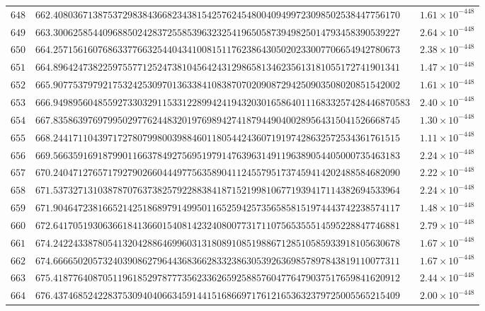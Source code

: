 \documentclass[12pt,reqno]{amsart}
\theoremstyle{remark}
\begin{document}
\begin{longtable}{clc}
$648$ & $662.4080367138753729838436682343815425762454800409499723098502538447756170$ & $1.61\times 10^{-448}$ \\
$649$ & $663.3006258544096885024283725585396323254196505873949825014793458390539227$ & $2.64\times 10^{-448}$ \\
$650$ & $664.2571561607686337766325440434100815117623864305020233007706654942780673$ & $2.38\times 10^{-448}$ \\
$651$ & $664.8964247382259755771252473810456424312986581346235613181055172741901341$ & $1.47\times 10^{-448}$ \\
$652$ & $665.9077537979217532425309701363384108387070209087294250903508020851542002$ & $1.61\times 10^{-448}$ \\
$653$ & $666.949895604855927330329115331228994241943203016586401116833257428446870583$ & $2.40\times 10^{-448}$ \\
$654$ & $667.8358639769799502977624483201976989427418794490400289564315041526668745$ & $1.30\times 10^{-448}$ \\
$655$ & $668.2441711043971727807998003988460118054424360719197428632572534361761515$ & $1.11\times 10^{-448}$ \\
$656$ & $669.5663591691879901166378492756951979147639631491196389054405000735463183$ & $2.24\times 10^{-448}$ \\
$657$ & $670.2404712765717927902660444977563589041124557951737459414202488584682090$ & $2.22\times 10^{-448}$ \\
$658$ & $671.5373271310387870763738257922883841871521998106771939417114382694533964$ & $2.24\times 10^{-448}$ \\
$659$ & $671.9046472381665214251868979149950116525942573565858151974443742238574117$ & $1.48\times 10^{-448}$ \\
$660$ & $672.6417051930636618413660154081423240800773171107565355514595228847746881$ & $2.79\times 10^{-448}$ \\
$661$ & $674.2422433878054132042886469960313180891085198867128510585933918105630678$ & $1.67\times 10^{-448}$ \\
$662$ & $674.6666502057324039086279644368366283323863053926369857897843819110077311$ & $1.67\times 10^{-448}$ \\
$663$ & $675.4187764087051196185297877735623362659258857604776479037517659841620912$ & $2.44\times 10^{-448}$ \\
$664$ & $676.4374685242283753094040663459144151686697176121653632379725005565215409$ & $2.00\times 10^{-448}$ \\

\end{longtable}
\end{document}
